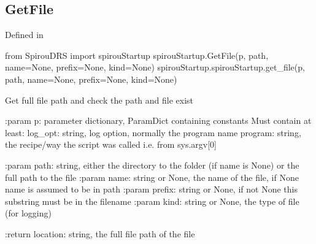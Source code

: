\begin{minipage}{\textwidth}
\subsection{GetFile}

Defined in \spirouStartup{}

\begin{pythonbox}
from SpirouDRS import spirouStartup
spirouStartup.GetFile(p, path, name=None, prefix=None, kind=None)
spirouStartup.spirouStartup.get_file(p, path, name=None, prefix=None, kind=None)
\end{pythonbox}

\begin{pythondocstring}
Get full file path and check the path and file exist

:param p: parameter dictionary, ParamDict containing constants
    Must contain at least:
            log_opt: string, log option, normally the program name
            program: string, the recipe/way the script was called
                     i.e. from sys.argv[0]

:param path: string, either the directory to the folder (if name is None) or
             the full path to the file
:param name: string or None, the name of the file, if None name is assumed
             to be in path
:param prefix: string or None, if not None this substring must be in the
               filename
:param kind: string or None, the type of file (for logging)

:return location: string, the full file path of the file
\end{pythondocstring}
\end{minipage}


